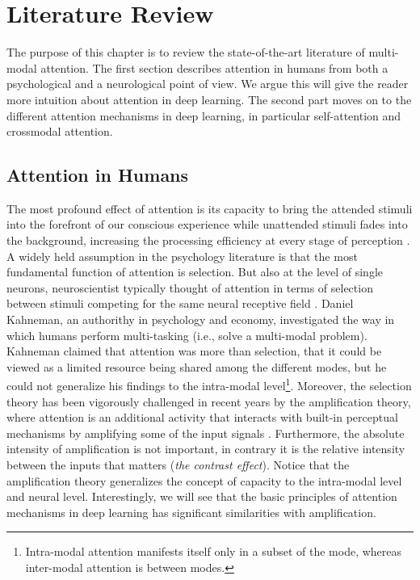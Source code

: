 \chapter{Literature Review}\label{chapter-literature-review} 

The purpose of this chapter is to review the state-of-the-art literature of multi-modal attention. The first section describes attention in humans from both a psychological and a neurological point of view. We argue this will give the reader more intuition about attention in deep learning. The second part moves on to the different attention mechanisms in deep learning, in particular self-attention and crossmodal attention. 


\section{Attention in Humans}
The most profound effect of attention is its capacity to bring the attended stimuli into the forefront of our conscious experience while unattended stimuli fades into the background, increasing the processing efficiency at every stage of perception \citep{watzl}. A widely held assumption in the psychology literature is that the most fundamental function of attention is selection. But also at the level of single neurons, neuroscientist typically thought of attention in terms of selection between stimuli competing for the same neural receptive field \citep{neuro-level}. Daniel Kahneman, an authorithy in psychology and economy, investigated the way in which humans perform multi-tasking (i.e., solve a multi-modal problem). Kahneman claimed that attention was more than selection, that it could be viewed as a limited resource being shared among the different modes, but he could not generalize his findings to the intra-modal level\footnote{Intra-modal attention manifests itself only in a subset of the mode, whereas inter-modal attention is between modes.}. Moreover, the selection theory has been vigorously challenged in recent years by the amplification theory, where attention is an additional activity that interacts with built-in perceptual mechanisms by amplifying some of the input signals \citep{amplification}. Furthermore, the absolute intensity of amplification is not important, in contrary it is the relative intensity between the inputs that matters (\textit{the contrast effect}). Notice that the amplification theory generalizes the concept of capacity to the intra-modal level and neural level. Interestingly, we will see that the basic principles of attention mechanisms in deep learning has significant similarities with amplification.

